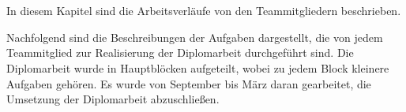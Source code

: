 \chapter{\docname}
In diesem Kapitel sind die Arbeitsverläufe von den Teammitgliedern beschrieben.


Nachfolgend sind die Beschreibungen der Aufgaben dargestellt, die von jedem Teammitglied zur Realisierung der Diplomarbeit durchgeführt sind. Die Diplomarbeit wurde in Hauptblöcken aufgeteilt, wobei zu jedem Block kleinere Aufgaben gehören. Es wurde von September bis März daran gearbeitet, die Umsetzung der Diplomarbeit abzuschließen.
\label{\docname}







\label{tb:aldo_arbeitsverlauf}
